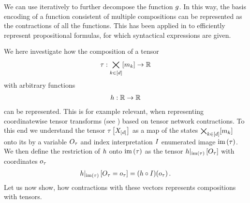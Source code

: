 We can use  iteratively to further decompose the function $g$.
In this way, the basis encoding of a function consistent of multiple compositions can be represented as the contractions of all the functions.
This has been applied in  to efficiently represent propositional formulas, for which syntactical expressions are given.


We here investigate how the composition of a tensor
\begin{align*}
    \tau : \bigtimes_{k\in[d]}[m_{k}] \rightarrow \mathbb{R}
\end{align*}
with arbitrary functions
\begin{align*}
    h: \mathbb{R} \rightarrow \mathbb{R}
\end{align*}
can be represented.
This is for example relevant, when representing coordinatewise tensor transforms (see ) based on tensor network contractions.
To this end we understand the tensor $\tau\left[X_{[d]}\right]$ as a map of the states $\bigtimes_{k\in[d]}[m_{k}]$ onto its by a variable $O_{\tau}$ and index interpretation $I$ enumerated image $\mathrm{im}\left(\tau\right)$.
We then define the restriction of $h$ onto $\mathrm{im}\left(\tau\right)$ as the tensor ${h}|_{\mathrm{im}\left(\tau\right)}\left[O_{\tau}\right]$ with coordinates $o_{\tau}$
\begin{align*}
    {h}|_{\mathrm{im}\left(\tau\right)}\left[O_{\tau}=o_{\tau}\right]
    = ({h}\circ{I})(o_{\tau}) \, .
\end{align*}
Let us now show, how contractions with these vectors represents compositions with tensors.

